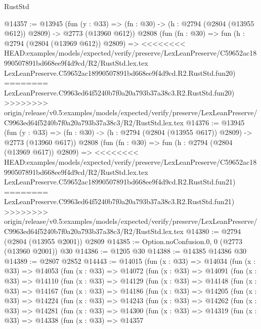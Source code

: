 \begin{lexlean}{RustStd}
\begin{coremodule}
{\begin{coremodule}
{{{{{{{{{{{{{{{{{{{{{{{{{{@14357 := @13945
    (fun (y : @33) => (fn : @30) -> (h : @2794 (@2804 (@13955 @612)) @2809) -> @2773 (@13960 @612))
    @2808
    (fun (fn : @30) =>
    fun (h : @2794 (@2804 (@13969 @612)) @2809) =>
<<<<<<<< HEAD:examples/models/expected/verify/preserve/LexLeanPreserve/C59652ac18990507891bd668ee9f4d9cd/R2/RustStd.lex.tex
    LexLeanPreserve.C59652ac18990507891bd668ee9f4d9cd.R2.RustStd.fun20)
========
    LexLeanPreserve.C9963ed64f5240b7f0a20a793b37a38c3.R2.RustStd.fun20)
>>>>>>>> origin/release/v0.5:examples/models/expected/verify/preserve/LexLeanPreserve/C9963ed64f5240b7f0a20a793b37a38c3/R2/RustStd.lex.tex
@14376 := @13945
    (fun (y : @33) => (fn : @30) -> (h : @2794 (@2804 (@13955 @617)) @2809) -> @2773 (@13960 @617))
    @2808
    (fun (fn : @30) =>
    fun (h : @2794 (@2804 (@13969 @617)) @2809) =>
<<<<<<<< HEAD:examples/models/expected/verify/preserve/LexLeanPreserve/C59652ac18990507891bd668ee9f4d9cd/R2/RustStd.lex.tex
    LexLeanPreserve.C59652ac18990507891bd668ee9f4d9cd.R2.RustStd.fun21)
========
    LexLeanPreserve.C9963ed64f5240b7f0a20a793b37a38c3.R2.RustStd.fun21)
>>>>>>>> origin/release/v0.5:examples/models/expected/verify/preserve/LexLeanPreserve/C9963ed64f5240b7f0a20a793b37a38c3/R2/RustStd.lex.tex
@14380 := @2794 (@2804 (@13955 @2001)) @2809
@14385 := Option.noConfusion.{0, 0} (@2773 (@13960 @2001)) @30
@14386 := @1205 @30
@14388 := @14385 @14386 @30
@14389 := @2807 @2852
@14443 := @14015
    (fun (x : @33) =>
    @14034
      (fun (x : @33) =>
      @14053
        (fun (x : @33) =>
        @14072
          (fun (x : @33) =>
          @14091
            (fun (x : @33) =>
            @14110
              (fun (x : @33) =>
              @14129
                (fun (x : @33) =>
                @14148
                  (fun (x : @33) =>
                  @14167
                    (fun (x : @33) =>
                    @14186
                      (fun (x : @33) =>
                      @14205
                        (fun (x : @33) =>
                        @14224
                          (fun (x : @33) =>
                          @14243
                            (fun (x : @33) =>
                            @14262
                              (fun (x : @33) =>
                              @14281
                                (fun (x : @33) =>
                                @14300
                                  (fun (x : @33) =>
                                  @14319
                                    (fun (x : @33) =>
                                    @14338
                                      (fun (x : @33) =>
                                      @14357
}}}}}}}}}}}}}}}}}}}}}}}}}}
\end{coremodule}}
\end{coremodule}
\end{lexlean}
